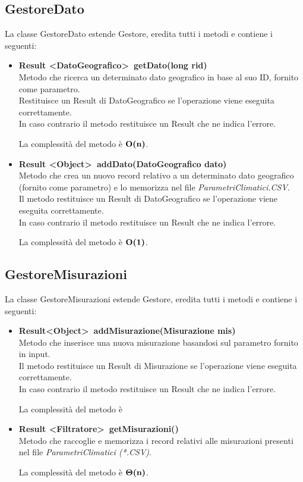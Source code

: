 \documentclass[a4paper, 12pt]{scrreprt}
\begin{document}
			\subsection{GestoreDato}
			La classe GestoreDato estende Gestore, eredita tutti i metodi e contiene i seguenti:
			\begin{itemize}
				\item \textbf{Result \textless DatoGeografico\textgreater~getDato(long rid)}
				\\Metodo che ricerca un determinato dato geografico in base al suo ID, fornito come parametro.
				\\Restituisce un Result di DatoGeografico se l'operazione viene eseguita correttamente.
				\\In caso contrario il metodo restituisce un Result che ne indica l'errore.
				
				La complessit\`a del metodo \`e $\mathbf{O}\textbf{(n)}$.
				
				\item \textbf {Result \textless Object\textgreater~addDato(DatoGeografico dato)}
				\\Metodo che crea un nuovo record relativo a un determinato dato geografico (fornito come parametro) e lo memorizza nel file \textit{ParametriClimatici.CSV}.
				\\Il metodo restituisce un Result di DatoGeografico se l'operazione viene eseguita correttamente.
				\\In caso contrario il metodo restituisce un Result che ne indica l'errore.
				
				La complessit\`a del metodo \`e $\mathbf{O}\textbf{(1)}$.
				
			\end{itemize}

			\subsection{GestoreMisurazioni}
			La classe GestoreMisurazioni estende Gestore, eredita tutti i metodi e contiene i seguenti:
			\begin{itemize}
				\item \textbf{Result\textless Object\textgreater~addMisurazione(Misurazione mis)}
				\\Metodo che inserisce una nuova misurazione basandosi sul parametro fornito in input.
				\\Il metodo restituisce un Result di Misurazione se l'operazione viene eseguita correttamente.
				\\In caso contrario il metodo restituisce un Result che ne indica l'errore.
				
				La complessit\`a del metodo \`e

				\item \textbf {Result \textless Filtratore\textgreater~getMisurazioni()}
				\\Metodo che raccoglie e memorizza i record relativi alle misurazioni presenti nel file \textit{ParametriClimatici (*.CSV)}.
				
				La complessit\`a del metodo \`e $\mathbf{\Theta}\textbf{(n)}$.
				
			\end{itemize}
\end{document}
